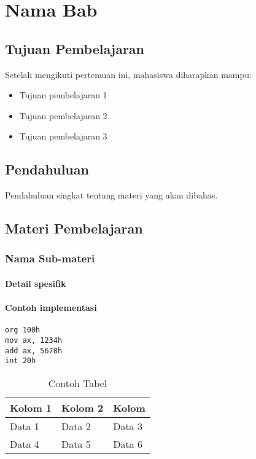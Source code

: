 \chapter{Nama Bab}\label{ch:label-bab}

\section{Tujuan Pembelajaran}\label{sec:label-bab-tujuan}
Setelah mengikuti pertemuan ini, mahasiswa diharapkan mampu:
\begin{itemize}
    \item Tujuan pembelajaran 1
    \item Tujuan pembelajaran 2
    \item Tujuan pembelajaran 3
\end{itemize}

\section{Pendahuluan}\label{sec:label-bab-pendahuluan}
Pendahuluan singkat tentang materi yang akan dibahas.

\section{Materi Pembelajaran}\label{sec:label-bab-materi}
\subsection{Nama Sub-materi}\label{subsec:label-bab-submateri}
\subsubsection{Detail spesifik}

\subsubsection{Contoh implementasi}

\begin{lstlisting}[caption=Contoh Kode Assembly, label={code:contoh}]
org 100h
mov ax, 1234h
add ax, 5678h
int 20h
\end{lstlisting}

\begin{table}[h]
\centering
\caption{Contoh Tabel}
\begin{tabular}{lll}
\toprule
\textbf{Kolom 1} & \textbf{Kolom 2} & \textbf{Kolom} \\
\midrule
Data 1 & Data 2 & Data 3 \\
Data 4 & Data 5 & Data 6 \\
\bottomrule
\end{tabular}
\label{tab:contoh}
\end{table}

